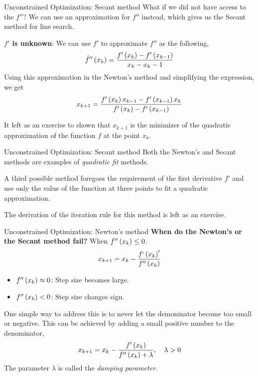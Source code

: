 \documentclass[aspectratio=169]{beamer}
\let\olditem\item
\renewcommand{\item}{\setlength{\itemsep}{\fill}\olditem}
\def\lp{\ensuremath\left(}
\def\rp{\ensuremath\right)}
\newcommand{\ct}[1]{\lp #1\rp}
\begin{document}
\begin{frame}{Unconstrained Optimization: Secant method}
  What if we did not have access to the $f''$? We can use an approximation for $f''$ instead, which gives us the Secant method for line search.
  \vspace{0.25cm}

  \textbf{$f'$ is unknown}: We can use $f'$ to approximate $f''$ as the following,
  \[ \hat{f}''\ct{x_k} = \frac{f'\ct{x_k} - f'\ct{x_{k-1}}}{x_k - x{_k-1}} \] 
  Using this approximation in the Newton's method and simplifying the expression, we get
  \[ x_{k+1} = \frac{f'\ct{x_k}x_{k-1} - f'\ct{x_{k-1}}x_k}{f'\ct{x_k} - f'\ct{x_{k - 1}}} \]

  It left as an exercise to shown that $x_{k+1}$ is the minimizer of the quadratic approximation of the function $f$ at the point $x_k$.

\end{frame}


\begin{frame}{Unconstrained Optimization: Secant method}
  Both the Newton's and Secant methods are examples of \textit{quadratic fit} methods. 
  \vspace{0.25cm}
  
  A third possible method foregoes the requirement of the first derivative $f'$ and use only the value of the function at three points to fit a quadratic approximation. 
  \vspace{0.25cm}

  The derivation of the iteration rule for this method is left as an exercise.
\end{frame}


\begin{frame}{Unconstrained Optimization: Newton's method}
  \textbf{When do the Newton's or the Secant method fail?} When $f''\ct{x_k} \leq 0$.
  \[ x_{k+1} = x_k - \frac{f`\ct{x_k}'}{f''\ct{x_k}} \]
  \begin{itemize}
    \item $f''\ct{x_k} \approx 0$: Step size becomes large.
    \item $f''\ct{x_k} < 0$: Step size changes sign.
  \end{itemize}
  
  One simple way to address this is to never let the demoninator become too small or negative. This can be achieved by adding a small positive number to the denominator,
  \[ x_{k+1} = x_k - \frac{f'\ct{x_k}}{f''\ct{x_k} + \lambda}, \quad \lambda > 0 \]
  The parameter $\lambda$ is called the \textit{damping parameter}.  
\end{frame}
\end{document}
